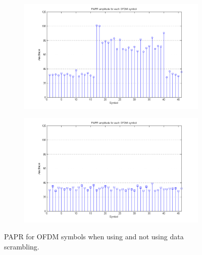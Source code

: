 \documentclass[12pt,a4paper,openright]{report}
\begin{document}
\begin{figure}[H]
 \centering
 \begin{subfigure}{.4\textwidth}
  	 \centering
      \includegraphics[width=1\textwidth]{noscrambler.png}
      \label{fig:noscrambler}
   \end{subfigure}
    \begin{subfigure}{0.4\textwidth}
    \centering
       \includegraphics[width=1\textwidth]{scramblereffect.png}
       \label{fig:scrambleryes}
       \end{subfigure}%
     \caption[PAPR for OFDM symbols when using and not using data scrambling.]{PAPR for OFDM symbols when using and not using data scrambling.}
     \label{fig:scramblers}
 \end{figure} 
\end{document}
